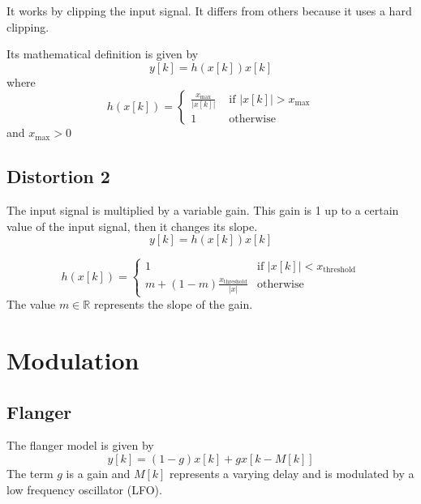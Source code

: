 \documentclass[11pt]{article}
\begin{document}
It works by clipping the input signal. It differs from others because it uses a hard clipping. 

Its mathematical definition is given by
\begin{equation}
	y[k] = h(x[k])x[k]
\end{equation}
where 
\begin{equation}
	h(x[k]) =
	\begin{cases}
		\frac{x_{\text{max}}}{|x[k]|}  & \text{ if } |x[k]| > x_{\text{max}} \\
		1 & \text{ otherwise } 
	\end{cases}
\end{equation}
and $x_\text{max}>0$


\subsection{Distortion 2}

The input signal is multiplied by a variable gain. This gain is 1 up to a certain value of the input
signal, then it changes its slope.
\begin{equation}
    y[k] = h(x[k])x[k]
    \label{eq:distortion2}
\end{equation}

\begin{equation}
    h(x[k]) = 
    \begin{cases}
        1 & \text{if } |x[k]| < x_{\text{threshold}} \\
        m + (1 - m)\frac{x_{\text{threshold}}}{|x|}& \text{otherwise}
    \end{cases}
    \label{eq:distortion2_gain}
\end{equation}
The value $m \in \mathbb{R}$ represents the slope of the gain.


\section{Modulation}

\subsection{Flanger}

The flanger model is given by
\begin{equation}
	y[k] = (1-g) x[k] + gx[k - M[k]]
\end{equation}
The term $g$ is a gain and $M[k]$ represents a varying delay and is modulated by a low frequency oscillator (LFO).
\end{document}
